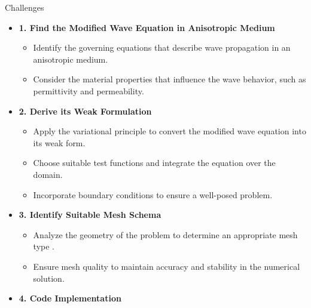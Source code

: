 \documentclass{beamer}
\begin{document}
\begin{frame}{Challenges}
    \begin{itemize}
        \item \textbf{1. Find the Modified Wave Equation in Anisotropic Medium}
        \begin{itemize}
            \item Identify the governing equations that describe wave propagation in an anisotropic medium.
            \item Consider the material properties that influence the wave behavior, such as permittivity and permeability.
        \end{itemize}
        
        \item \textbf{2. Derive its Weak Formulation}
        \begin{itemize}
            \item Apply the variational principle to convert the modified wave equation into its weak form.
            \item Choose suitable test functions and integrate the equation over the domain.
            \item Incorporate boundary conditions to ensure a well-posed problem.
        \end{itemize}

        \item \textbf{3. Identify Suitable Mesh Schema}
        \begin{itemize}
            \item Analyze the geometry of the problem to determine an appropriate mesh type .
            \item Ensure mesh quality to maintain accuracy and stability in the numerical solution.
        \end{itemize}

        \item \textbf{4. Code Implementation}
    \end{itemize}
\end{frame}
\end{document}
